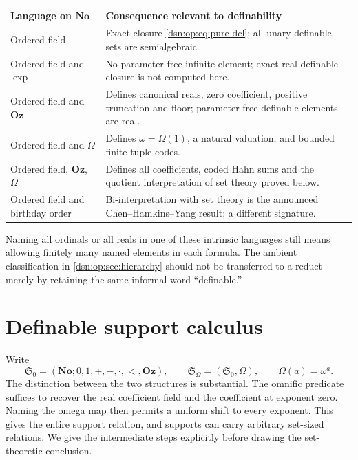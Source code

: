 \documentclass[11pt,a4paper]{article}
\numberwithin{equation}{section}
\theoremstyle{definition}
\theoremstyle{remark}
\newcommand{\No}{\mathbf{No}}
\newcommand{\Oz}{\mathbf{Oz}}
\newcommand{\Szero}{\mathfrak S_0}
\newcommand{\Somega}{\mathfrak S_\Omega}
\begin{document}
\begin{center}
\begin{tabular}{P{0.29\textwidth}P{0.6\textwidth}}
\toprule
Language on \(\No\) & Consequence relevant to definability \\
\midrule
Ordered field & Exact closure \eqref{dsn:op:eq:pure-dcl}; all unary definable sets
are semialgebraic.\\
Ordered field and \(\exp\) & No parameter-free infinite element; exact
real definable closure is not computed here.\\
Ordered field and \(\Oz\) & Defines canonical reals, zero coefficient,
positive truncation and floor; parameter-free definable elements are real.\\
Ordered field and \(\Omega\) & Defines \(\omega=\Omega(1)\), a natural
valuation, and bounded finite-tuple codes.\\
Ordered field, \(\Oz\), \(\Omega\) & Defines all coefficients, coded Hahn
sums and the quotient interpretation of set theory proved below.\\
Ordered field and birthday order & Bi-interpretation with set theory is
the announced Chen--Hamkins--Yang result; a different signature.\\
\bottomrule
\end{tabular}
\end{center}

Naming all ordinals or all reals in one of these intrinsic languages still
means allowing finitely many named elements in each formula.  The ambient
classification in \cref{dsn:op:sec:hierarchy} should not be transferred to a
reduct merely by retaining the same informal word ``definable.''



\section{Definable support calculus}
\label{dsn:op:sec:interpretation}

Write
\[
 \Szero=(\No;0,1,+,-,\cdot,<,\Oz),\qquad
 \Somega=(\Szero,\Omega),\qquad
 \Omega(a)=\omega^a.
\]
The distinction between the two structures is substantial.  The omnific
predicate suffices to recover the real coefficient field and the coefficient
at exponent zero.  Naming the omega map then permits a uniform shift to
every exponent.  This gives the entire support relation, and supports can
carry arbitrary set-sized relations.  We give the intermediate steps
explicitly before drawing the set-theoretic conclusion.
\end{document}
